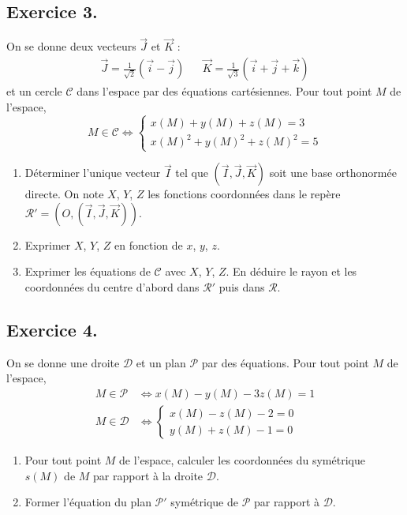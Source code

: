 \subsection*{Exercice 3.}
On se donne deux vecteurs $\overrightarrow J$ et $\overrightarrow K$ :
\begin{align*}
 \overrightarrow J = \frac{1}{\sqrt{2}}\left(\overrightarrow i - \overrightarrow j \right)
& &
 \overrightarrow K = \frac{1}{\sqrt{3}}\left(\overrightarrow i + \overrightarrow j + \overrightarrow k \right) 
\end{align*}
et un cercle $\mathcal C$ dans l'espace par des équations cartésiennes. Pour tout point $M$ de l'espace,
\begin{displaymath}
 M\in \mathcal{C} \Leftrightarrow
\left\lbrace 
\begin{aligned}
 x(M) + y(M) + z(M)  = 3 \\
 x(M)^2 + y(M)^2 + z(M)^2 = 5
\end{aligned}
\right.  
\end{displaymath}
\begin{enumerate}
 \item Déterminer l'unique vecteur $\overrightarrow I$ tel que $(\overrightarrow I, \overrightarrow J, \overrightarrow K)$ soit une base orthonormée directe. On note $X$, $Y$, $Z$ les fonctions coordonnées dans le repère $\mathcal R' = (O,(\overrightarrow I , \overrightarrow J , \overrightarrow K))$.
 \item Exprimer $X$, $Y$, $Z$ en fonction de $x$, $y$, $z$.
 \item Exprimer les équations de $\mathcal C$ avec $X$, $Y$, $Z$. En déduire le rayon et les coordonnées du centre d'abord dans $\mathcal R'$ puis dans $\mathcal R$.
\end{enumerate}

\subsection*{Exercice 4.}
On se donne une droite $\mathcal{D}$ et un plan $\mathcal{P}$ par des équations. Pour tout point $M$ de l'espace,
\begin{align*}
 M\in \mathcal{P}&\Leftrightarrow x(M) - y(M) - 3z(M) = 1
\\
 M\in \mathcal{D}&\Leftrightarrow
\left\lbrace 
\begin{aligned}
 x(M) - z(M) -2 = 0 \\
  y(M) + z(M) -1 = 0
\end{aligned}
\right. 
\end{align*}
\begin{enumerate}
 \item Pour tout point $M$ de l'espace, calculer les coordonnées du symétrique $s(M)$ de $M$ par rapport à la droite $\mathcal{D}$.
 \item Former l'équation du plan $\mathcal{P}'$ symétrique de $\mathcal{P}$ par rapport à $\mathcal{D}$.
\end{enumerate}
